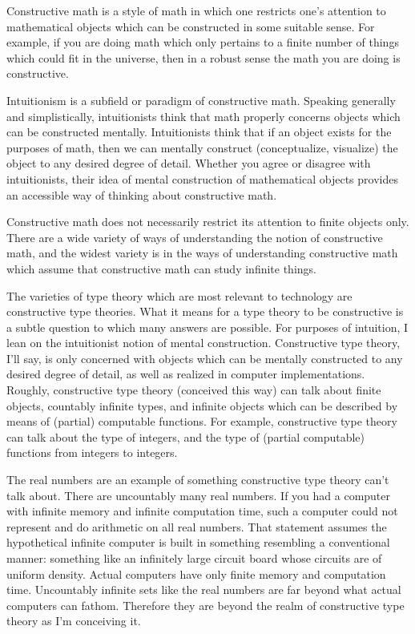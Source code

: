 \documentclass{article}
\begin{document}
Constructive math is a style of math in which one restricts one's attention to mathematical objects which can be constructed in some suitable sense. For example, if you are doing math which only pertains to a finite number of things which could fit in the universe, then in a robust sense the math you are doing is constructive.

Intuitionism is a subfield or paradigm of constructive math. Speaking generally and simplistically, intuitionists think that math properly concerns objects which can be constructed mentally. Intuitionists think that if an object exists for the purposes of math, then we can mentally construct (conceptualize, visualize) the object to any desired degree of detail. Whether you agree or disagree with intuitionists, their idea of mental construction of mathematical objects provides an accessible way of thinking about constructive math.

Constructive math does not necessarily restrict its attention to finite objects only. There are a wide variety of ways of understanding the notion of constructive math, and the widest variety is in the ways of understanding constructive math which assume that constructive math can study infinite things.

The varieties of type theory which are most relevant to technology are constructive type theories. What it means for a type theory to be constructive is a subtle question to which many answers are possible. For purposes of intuition, I lean on the intuitionist notion of mental construction. Constructive type theory, I'll say, is only concerned with objects which can be mentally constructed to any desired degree of detail, as well as realized in computer implementations. Roughly, constructive type theory (conceived this way) can talk about finite objects, countably infinite types, and infinite objects which can be described by means of (partial) computable functions. For example, constructive type theory can talk about the type of integers, and the type of (partial computable) functions from integers to integers.

The real numbers are an example of something constructive type theory can't talk about. There are uncountably many real numbers. If you had a computer with infinite memory and infinite computation time, such a computer could not represent and do arithmetic on all real numbers. That statement assumes the hypothetical infinite computer is built in something resembling a conventional manner: something like an infinitely large circuit board whose circuits are of uniform density. Actual computers have only finite memory and computation time. Uncountably infinite sets like the real numbers are far beyond what actual computers can fathom. Therefore they are beyond the realm of constructive type theory as I'm conceiving it.
\end{document}
